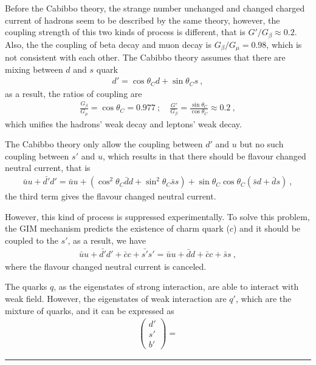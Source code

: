 \documentclass[12pt,twoside]{report}
\numberwithin{problemname}{chapter}
\newenvironment{solution}{\vspace{1em}\par\noindent{\large\textbf{\textsc{Solution}}}\par}{\vspace{1em}\hrule}
\begin{document}
\begin{solution}
    Before the Cabibbo theory, the strange number unchanged and changed charged current of hadrons seem to be described by the same theory, however, the coupling strength of this two kinds of process is different, that is $G'/G_{\beta}\approx 0.2$. Also, the the coupling of beta decay and muon decay is $G_{\beta}/G_{\mu}=0.98$, which is not consistent with each other. The Cabibbo theory assumes that there are mixing between $d$ and $s$ quark
    \begin{align}
        d'=\cos{\theta_C}d+\sin{\theta_C}s\ ,
    \end{align}
    as a result, the ratios of coupling are
    \begin{align}
        \frac{G_{\beta}}{G_{\mu}}=\cos{\theta_C}=0.977\ ;\quad\frac{G'}{G_{\beta}}=\frac{\sin{\theta_C}}{\cos{\theta_C}}\approx 0.2\ ,
    \end{align}
    which unifies the hadrons' weak decay and leptons' weak decay.\par
    The Cabibbo theory only allow the coupling between $d'$ and $u$ but no such coupling between $s'$ and $u$, which results in that there should be flavour changed neutral current, that is
    \begin{align}
        \bar{u}u+\bar{d'}d'=\bar{u}u+(\cos^2{\theta_C}\bar{d}d+\sin^2{\theta_C}\bar{s}s)+\sin{\theta_C}\cos{\theta_C}(\bar{s}d+\bar{d}s)\ ,
    \end{align}
    the third term gives the flavour changed neutral current.\par
    However, this kind of process is suppressed experimentally. To solve this problem, the GIM mechanism predicts the existence of charm quark ($c$) and it should be coupled to the $s'$, as a result, we have
    \begin{align}
        \bar{u}u+\bar{d'}d'+\bar{c}c+\bar{s'}s'=\bar{u}u+\bar{d}d+\bar{c}c+\bar{s}s\ ,
    \end{align}
    where the flavour changed neutral current is canceled.\par
    The quarks $q$, as the eigenstates of strong interaction, are able to interact with weak field. However, the eigenstates of weak interaction are $q'$, which are the mixture of quarks, and it can be expressed as
    \begin{align}
        \begin{pmatrix}
            d' \\
            s' \\
            b'
        \end{pmatrix}=

\end{align}
\end{solution}
\end{document}
